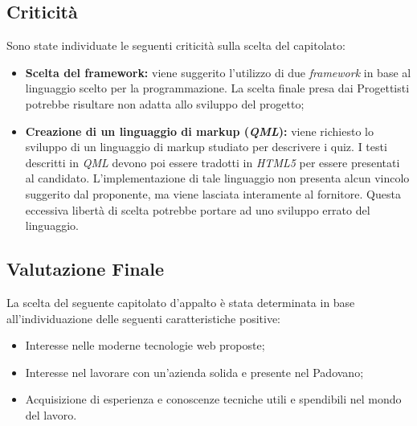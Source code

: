 \subsection{Criticità}
Sono state individuate le seguenti criticità sulla scelta del capitolato:
\begin{itemize}
\item \textbf{Scelta del framework:} viene suggerito l’utilizzo di due \textit{framework} in base al linguaggio scelto per la programmazione. La scelta finale presa dai Progettisti potrebbe risultare non adatta allo sviluppo del progetto;
\item \textbf{Creazione di un linguaggio di markup (\textit{QML}):} viene richiesto lo sviluppo di un linguaggio di markup studiato per descrivere i quiz. I testi descritti in \textit{QML} devono poi essere tradotti in \textit{HTML5} per essere presentati al candidato. L’implementazione di tale linguaggio non presenta alcun vincolo suggerito dal proponente, ma viene lasciata interamente al fornitore. Questa eccessiva libertà di scelta potrebbe portare ad uno sviluppo errato del linguaggio.
\end{itemize}

\subsection{Valutazione Finale}
La scelta del seguente capitolato d’appalto è stata determinata in base all’individuazione delle seguenti caratteristiche positive:
\begin{itemize} 
\item Interesse nelle moderne tecnologie web proposte;
\item Interesse nel lavorare con un'azienda solida e presente nel Padovano;
\item Acquisizione di esperienza e conoscenze tecniche utili e spendibili nel mondo del lavoro.
\end{itemize}
